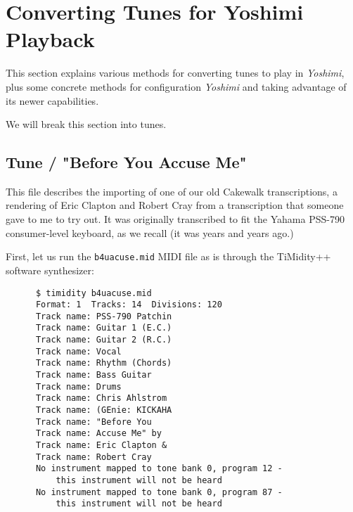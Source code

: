 %
%
%

\section{Converting Tunes for Yoshimi Playback}
\label{sec:conversions}

   This section explains various methods for converting tunes to play in
   \textsl{Yoshimi}, plus some concrete methods for configuration
   \textsl{Yoshimi} and taking advantage of its newer capabilities.

   We will break this section into tunes.

\subsection{Tune / "Before You Accuse Me"}
\label{subsec:conversions_tune_b4uacuse}

   This file describes the importing of one of our old Cakewalk transcriptions,
   a rendering of Eric Clapton and Robert Cray from a transcription that
   someone gave to me to try out.  It was originally transcribed to fit the
   Yahama PSS-790 \cite{pss790} 
   consumer-level keyboard, as we recall (it was years and years ago.)

   First, let us run the \texttt{b4uacuse.mid} MIDI file
   as is through the TiMidity++ \cite{timidity} software synthesizer:

   \begin{verbatim}
      $ timidity b4uacuse.mid 
      Format: 1  Tracks: 14  Divisions: 120
      Track name: PSS-790 Patchin
      Track name: Guitar 1 (E.C.)
      Track name: Guitar 2 (R.C.)
      Track name: Vocal
      Track name: Rhythm (Chords)
      Track name: Bass Guitar
      Track name: Drums
      Track name: Chris Ahlstrom
      Track name: (GEnie: KICKAHA
      Track name: "Before You
      Track name: Accuse Me" by
      Track name: Eric Clapton &
      Track name: Robert Cray
      No instrument mapped to tone bank 0, program 12 -
          this instrument will not be heard
      No instrument mapped to tone bank 0, program 87 -
          this instrument will not be heard
   \end{verbatim}

